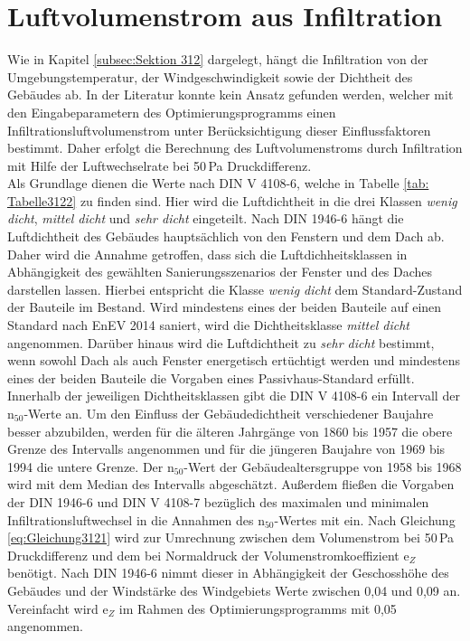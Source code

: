 \section*{Luftvolumenstrom aus Infiltration}

Wie in Kapitel \ref{subsec:Sektion 312} dargelegt, hängt die Infiltration von der Umgebungstemperatur, der Windgeschwindigkeit sowie der Dichtheit des Gebäudes ab.
In der Literatur konnte kein Ansatz gefunden werden, welcher mit den Eingabeparametern des Optimierungsprogramms einen Infiltrationsluftvolumenstrom unter Berücksichtigung dieser Einflussfaktoren bestimmt.
Daher erfolgt die Berechnung des Luftvolumenstroms durch Infiltration mit Hilfe der Luftwechselrate bei 50\,Pa Druckdifferenz.\\
Als Grundlage dienen die Werte nach DIN V 4108-6, welche in Tabelle \ref{tab: Tabelle3122} zu finden sind.
Hier wird die Luftdichtheit in die drei Klassen \textit{wenig dicht}, \textit{mittel dicht} und \textit{sehr dicht} eingeteilt.
Nach DIN 1946-6 hängt die Luftdichtheit des Gebäudes hauptsächlich von den Fenstern und dem Dach ab.
Daher wird die Annahme getroffen, dass sich die Luftdichheitsklassen in Abhängigkeit des gewählten Sanierungsszenarios der Fenster und des Daches darstellen lassen.
Hierbei entspricht die Klasse \textit{wenig dicht} dem Standard-Zustand der Bauteile im Bestand.
Wird mindestens eines der beiden Bauteile auf einen Standard nach EnEV 2014 saniert, wird die Dichtheitsklasse \textit{mittel dicht} angenommen.
Darüber hinaus wird die Luftdichtheit zu \textit{sehr dicht} bestimmt, wenn sowohl Dach als auch Fenster energetisch ertüchtigt werden und mindestens eines der beiden Bauteile die Vorgaben eines Passivhaus-Standard erfüllt.\\
Innerhalb der jeweiligen Dichtheitsklassen gibt die DIN V 4108-6 ein Intervall der n\(_{50}\)-Werte an.
Um den Einfluss der Gebäudedichtheit verschiedener Baujahre besser abzubilden, werden für die älteren Jahrgänge von 1860 bis 1957 die obere Grenze des Intervalls angenommen und für die jüngeren Baujahre von 1969 bis 1994 die untere Grenze. 
Der n\(_{50}\)-Wert der Gebäudealtersgruppe von 1958 bis 1968 wird mit dem Median des Intervalls abgeschätzt.
Außerdem fließen die Vorgaben der DIN 1946-6 und DIN V 4108-7 bezüglich des maximalen und minimalen Infiltrationsluftwechsel in die Annahmen des n\(_{50}\)-Wertes mit ein.
Nach Gleichung \ref{eq:Gleichung3121} wird zur Umrechnung zwischen dem Volumenstrom bei 50\,Pa Druckdifferenz und dem bei Normaldruck der Volumenstromkoeffizient e\(_Z\) benötigt.
Nach DIN 1946-6 nimmt dieser in Abhängigkeit der Geschosshöhe des Gebäudes und der Windstärke des Windgebiets Werte zwischen 0,04 und 0,09 an.
Vereinfacht wird e\(_Z\) im Rahmen des Optimierungsprogramms mit 0,05 angenommen.

